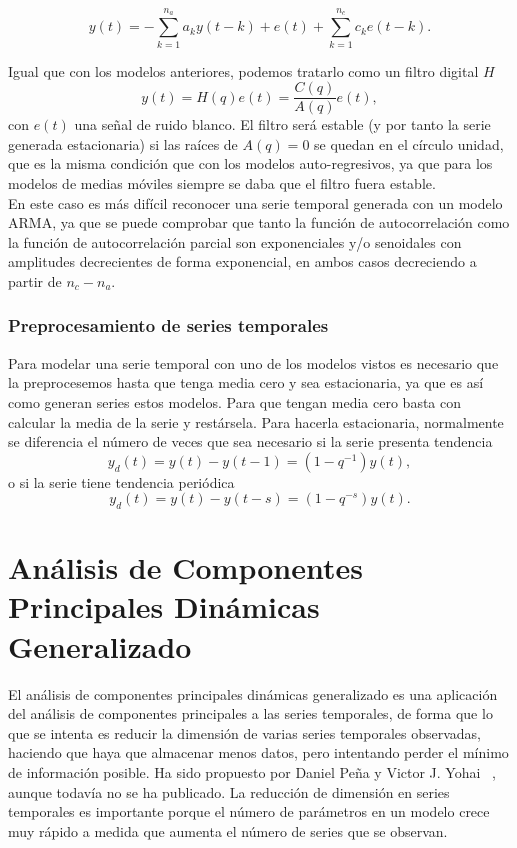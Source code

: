 \begin{equation}
y(t) = - \sum_{k=1}^{n_a} a_k y(t-k) + e(t) + \sum_{k=1}^{n_c} c_k e(t-k).
\end{equation}

Igual que con los modelos anteriores, podemos tratarlo como un filtro digital $H$
\[	y(t) = H(q)e(t) = \frac{C(q)}{A(q)}e(t),	\]
con $e(t)$ una señal de ruido blanco. El filtro será estable (y por tanto la serie generada estacionaria) si las raíces de $A(q) = 0$ se quedan en el círculo unidad, que es la misma condición que con los modelos auto-regresivos, ya que para los modelos de medias móviles siempre se daba que el filtro fuera estable.\\

En este caso es más difícil reconocer una serie temporal generada con un modelo ARMA, ya que se puede comprobar que tanto la función de autocorrelación como la función de autocorrelación parcial son exponenciales y/o senoidales con amplitudes decrecientes de forma exponencial, en ambos casos decreciendo a partir de $n_c-n_a$.

\subsubsection{Preprocesamiento de series temporales}

Para modelar una serie temporal con uno de los modelos vistos es necesario que la preprocesemos hasta que tenga media cero y sea estacionaria, ya que es así como generan series estos modelos. Para que tengan media cero basta con calcular la media de la serie y restársela. Para hacerla estacionaria, normalmente se diferencia el número de veces que sea necesario si la serie presenta tendencia
\[	y_d(t) = y(t) - y(t-1) = (1 - q^{-1})y(t),	\]
o si la serie tiene tendencia periódica
\[	y_d(t) = y(t) - y(t-s) = (1 - q^{-s})y(t).	\]

\newpage

\section{Análisis de Componentes Principales Dinámicas Generalizado}

El análisis de componentes principales dinámicas generalizado es una aplicación del análisis de componentes principales a las series temporales, de forma que lo que se intenta es reducir la dimensión de varias series temporales observadas, haciendo que haya que almacenar menos datos, pero intentando perder el mínimo de información posible. Ha sido propuesto por Daniel Peña y Victor J. Yohai ~\cite{pena16}, aunque todavía no se ha publicado. La reducción de dimensión en series temporales es importante porque el número de parámetros en un modelo crece muy rápido a medida que aumenta el número de series que se observan.

